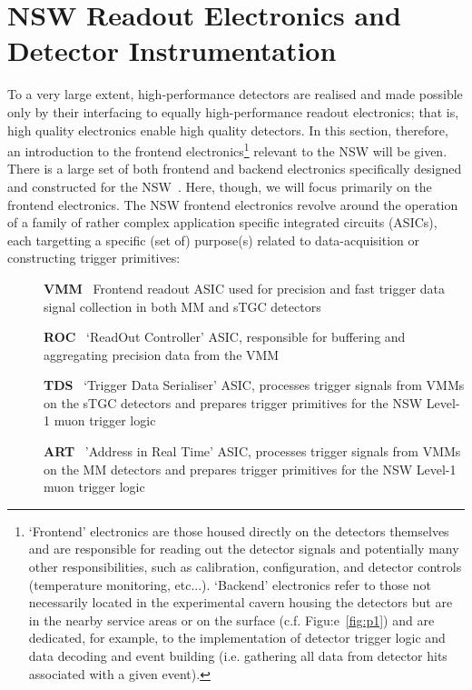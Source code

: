 \section{NSW Readout Electronics and Detector Instrumentation}
\label{sec:nsw_elx}

{\color{red}{make it clearer that the tracking data readout of both sTGC and MM is very similar, since they
both use the VMM...?}}

To a very large extent, high-performance detectors are realised and made
possible only by their interfacing to equally high-performance readout electronics;
that is, high quality electronics enable high quality detectors.
{\color{red}{See Appendix XXX for a discussion on the general characteristics of
detector readout electronics.}}
In this section, therefore, an introduction to the frontend electronics\footnote{`Frontend' electronics
are those housed directly on the detectors themselves and are responsible for reading out the
detector signals and potentially many other responsibilities, such as calibration, configuration, and
detector controls (temperature monitoring, etc...). `Backend' electronics refer to those
not necessarily located in the experimental cavern housing the detectors but are in the nearby
service areas or on the surface (c.f. Figu:e~\ref{fig:p1}) and are dedicated, for example, to the implementation of detector trigger logic
and data decoding and event building (i.e. gathering all data from detector hits associated with a given event).}
relevant to the NSW will be given.
There is a large set of both frontend and backend electronics specifically
designed and constructed for the NSW~\cite{NSWFrontEndChristos}.
Here, though, we will focus primarily on the frontend electronics.
The NSW frontend electronics revolve around the operation of a family
of rather complex application specific integrated circuits (ASICs),
each targetting a specific (set of) purpose(s) related to data-acquisition or
constructing trigger primitives:

\begin{description}
    \item[] \textbf{VMM}~\cite{VMM1GDG,VMMASIC,VMM3George} Frontend readout ASIC used for precision and fast trigger data signal collection in both MM and sTGC detectors
    \item[] \textbf{ROC}~\cite{NSWTDR,NSWFrontEndChristos} `ReadOut Controller' ASIC, responsible for buffering and aggregating precision data from the VMM
    \item[] \textbf{TDS}~\cite{TDS} `Trigger Data Serialiser' ASIC, processes trigger signals from VMMs on the sTGC detectors and prepares trigger primitives for the NSW Level-1 muon trigger logic
    \item[] \textbf{ART}~\cite{NSWTDR,ARTASIC} 'Address in Real Time' ASIC, processes trigger signals from VMMs on the MM detectors and prepares trigger primitives for the NSW Level-1 muon trigger logic
\end{description}

